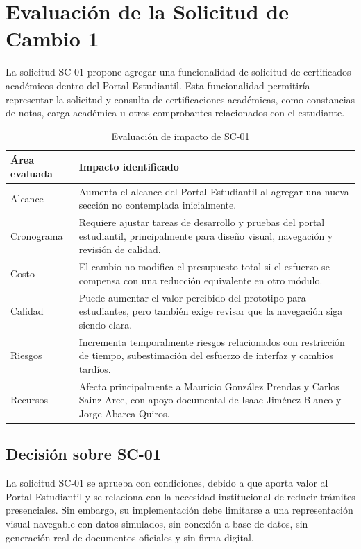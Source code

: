 \documentclass[11pt,spanish]{article}
\begin{document}
\section{Evaluación de la Solicitud de Cambio 1}

La solicitud SC-01 propone agregar una funcionalidad de solicitud de certificados académicos dentro del Portal Estudiantil. Esta funcionalidad permitiría representar la solicitud y consulta de certificaciones académicas, como constancias de notas, carga académica u otros comprobantes relacionados con el estudiante.

\begin{table}[H]
\centering
\caption{Evaluación de impacto de SC-01}
\label{tab:evaluacion-sc01}
{\small
\begin{tabularx}{\textwidth}{p{3.2cm} Y}
\toprule
\textbf{Área evaluada} & \textbf{Impacto identificado} \\
\midrule
Alcance & Aumenta el alcance del Portal Estudiantil al agregar una nueva sección no contemplada inicialmente. \\
Cronograma & Requiere ajustar tareas de desarrollo y pruebas del portal estudiantil, principalmente para diseño visual, navegación y revisión de calidad. \\
Costo & El cambio no modifica el presupuesto total si el esfuerzo se compensa con una reducción equivalente en otro módulo. \\
Calidad & Puede aumentar el valor percibido del prototipo para estudiantes, pero también exige revisar que la navegación siga siendo clara. \\
Riesgos & Incrementa temporalmente riesgos relacionados con restricción de tiempo, subestimación del esfuerzo de interfaz y cambios tardíos. \\
Recursos & Afecta principalmente a Mauricio González Prendas y Carlos Sainz Arce, con apoyo documental de Isaac Jiménez Blanco y Jorge Abarca Quiros. \\
\bottomrule
\end{tabularx}
}
\end{table}

\subsection{Decisión sobre SC-01}

La solicitud SC-01 se aprueba con condiciones, debido a que aporta valor al Portal Estudiantil y se relaciona con la necesidad institucional de reducir trámites presenciales. Sin embargo, su implementación debe limitarse a una representación visual navegable con datos simulados, sin conexión a base de datos, sin generación real de documentos oficiales y sin firma digital.
\end{document}
